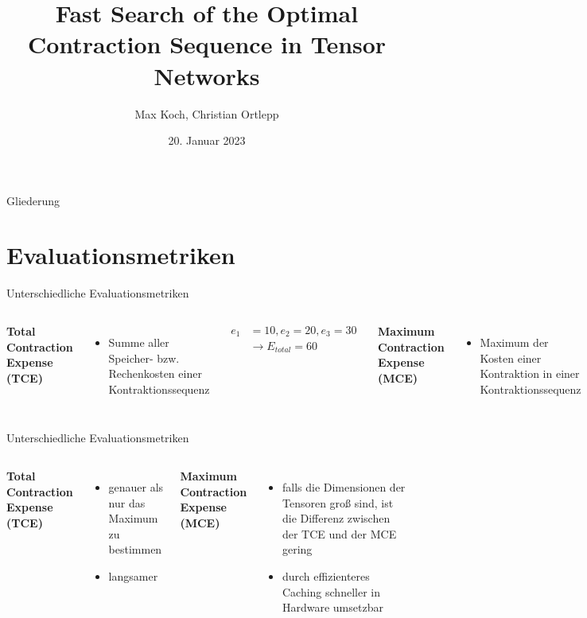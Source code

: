 \documentclass{beamer}
\title{Fast Search of the Optimal Contraction Sequence in Tensor Networks\cite{9325533}}
\author{Max Koch, Christian Ortlepp}
\institute{Friedrich-Schiller-Universität Jena}
\date{20. Januar 2023}
\begin{document}
	
	\maketitle 
	\begin{frame}[allowframebreaks]{Gliederung}
		\tableofcontents
	\end{frame}
	
	\section{Evaluationsmetriken}
		\begin{frame}{Unterschiedliche Evaluationsmetriken}
			\begin{columns}[]

					\textbf{Total Contraction Expense (TCE)}
					\begin{itemize}
						\item Summe aller Speicher- bzw. Rechenkosten einer Kontraktionssequenz
					\end{itemize}
					\begin{align*}
						e_1 &= 10, e_2 = 20, e_3 = 30 \\
						&\rightarrow E_{total} = 60
					\end{align*}


					\textbf{Maximum Contraction Expense (MCE)}
					\begin{itemize}
						\item Maximum der Kosten einer Kontraktion in einer Kontraktionssequenz
					\end{itemize}
					\begin{align*}
						e_1 &= 10, e_2 = 20, e_3 = 30 \\
						&\rightarrow E_{max} = 30
					\end{align*}
			\end{columns}
		\end{frame}

		\begin{frame}{Unterschiedliche Evaluationsmetriken}
			\begin{columns}	
						\textbf{Total Contraction Expense (TCE)}
						\begin{itemize}
							\item genauer als nur das Maximum zu bestimmen
							\item langsamer
						\end{itemize}


					\textbf{Maximum Contraction Expense (MCE)}
					\begin{itemize}
						\item falls die Dimensionen der Tensoren groß sind, ist die Differenz zwischen der TCE und der MCE gering
						\item durch effizienteres Caching schneller in Hardware umsetzbar
					\end{itemize}

			\end{columns}
		\end{frame}
\end{document}
